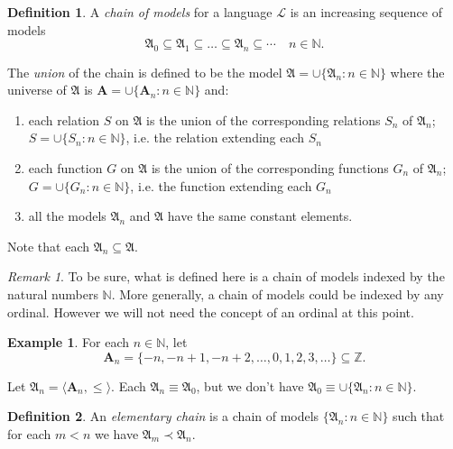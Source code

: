\documentclass[titlepage, oneside]{amsbook}
\theoremstyle{plain}
\theoremstyle{definition}
\newtheorem{examples}{Example}
\newtheorem{definition}{Definition}
\theoremstyle{remark}
\newtheorem*{rem}{Remark}
\newcommand{\ba}{\ensuremath{\mathbf{A}}}
\newcommand{\nat}{\ensuremath{\mathbb{N}}}
\begin{document}
\begin{definition}
%
%
 A \emph{chain of models} for a language
$\mathcal{L}$ 
is an increasing sequence of models \[ \mathfrak{A}_{0} \subseteq 
\mathfrak{A}_{1} \subseteq \dots \subseteq \mathfrak{A}_{n} \subseteq 
\cdots \quad n \in \nat . \]

 The \emph{union} of the chain is defined to be the model 
$\mathfrak{A}=  \cup \{ \mathfrak{A}_{n} :n \in \nat\} $ where
the universe of 
$\mathfrak{A}$ is $ \ba = \cup \{  \ba_{n} :n \in \nat\}$
and: 
\begin{enumerate}
\item each relation $S$ on $\mathfrak{A}$ is the union of the
corresponding relations $S_{n}$ of $\mathfrak{A}_{n}$; $S =
\cup \{  S_{n}:n \in \nat \} $, i.e. the relation
extending each $S_n$

\item each function $G$ on $\mathfrak{A}$ is the union of the
corresponding functions $G_{n}$ of $\mathfrak{A}_{n}$; $G =
\cup \{  G_{n} :n \in \nat \} $, i.e. the function
extending each $G_n$

\item all the models $\mathfrak{A}_{n}$ and $ \mathfrak{A}$ have the
same constant elements.

\end{enumerate} Note that each $\mathfrak{A}_{n} \subseteq
\mathfrak{A}$.  

\end{definition}

\begin{rem}
 To be sure, what is defined here is a chain of models
indexed by the natural numbers $\nat$.  More generally, a chain of
models could be indexed by any ordinal. However we will not need the
concept of an ordinal at this point.
\end{rem}

\begin{examples} For each $n \in \mathbb{N}$, let \[\ba _{n} = \{ -n , -n+1,
-n+2, \dots , 0,1,2,3, \dots \} \subseteq \mathbb{Z}.\] 

Let $\mathfrak{A}_{n} = \langle \mathbf{A}_{n}, \leq \rangle $. Each
$\mathfrak{A}_{n} \equiv \mathfrak{A}_{0} $, but we don't have
$\mathfrak{A}_{0} \equiv \cup \{\mathfrak{A}_{n} : n \in
\mathbb{N} \} $. 

\end{examples}

\begin{definition}
%
 An \emph{elementary chain} is a chain
of models $\{
\mathfrak{A}_{n} : n \in \nat \}$ such that for each $m < n $ we have
$\mathfrak{A}_{m} \prec \mathfrak{A}_{n}$.
\end{definition}
\end{document}
